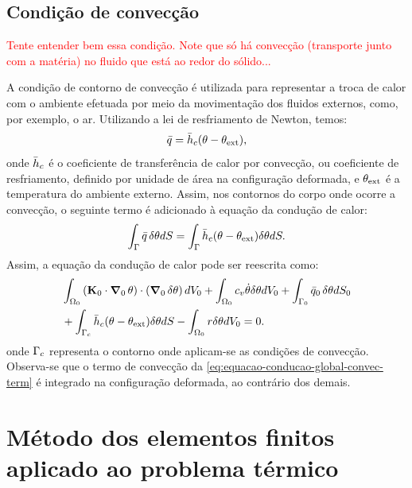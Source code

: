 \documentclass[Tese.tex]{subfiles}
\begin{document}
\subsection{Condição de convecção}

\textcolor{red}{Tente entender bem essa condição. Note que só há convecção (transporte junto com a matéria) no fluido que está ao redor do sólido...}

A condição de contorno de convecção é utilizada para representar a troca de calor com o ambiente efetuada por meio da movimentação dos fluidos externos, como, por exemplo, o ar. Utilizando a lei de resfriamento de Newton, temos:
\begin{equation}
\bar{q} = \bar{h}_c(\theta-\theta_\text{ext}),
\end{equation}
onde $\bar{h}_c$ é o coeficiente de transferência de calor por convecção, ou coeficiente de resfriamento, definido por unidade de área na configuração deformada, e $\theta_\text{ext}$ é a temperatura do ambiente externo. Assim, nos contornos do corpo onde ocorre a convecção, o seguinte termo é adicionado à equação da condução de calor:
\begin{equation}
\int_{\Gamma}\bar{q}\,\delta\theta dS = \int_{\Gamma}\bar{h}_c(\theta-\theta_\text{ext})\delta\theta dS.
\end{equation}
Assim, a equação da condução de calor pode ser reescrita como:
\begin{equation}\label{eq:equacao-conducao-global-convec-term}
\begin{aligned}
&\int_{\Omega_0}\left(\mathbf{K}_0\cdot\boldsymbol{\nabla}_0\,\theta\right)\cdot\left(\boldsymbol{\nabla}_0\,\delta\theta\right) dV_0 + \int_{\Omega_0}c_v\dot{\theta}\delta\theta dV_0 + \int_{\Gamma_0}\bar{q}_0\,\delta\theta dS_0 \\& + \int_{\Gamma_{c}}\bar{h}_c(\theta-\theta_\text{ext})\delta\theta dS - \int_{\Omega_0} r\delta\theta dV_0  = 0.
\end{aligned}
\end{equation}
onde $\Gamma_{c}$ representa o contorno onde aplicam-se as condições de convecção. Observa-se que o termo de convecção da \cref{eq:equacao-conducao-global-convec-term} é integrado na configuração deformada, ao contrário dos demais.

\section{Método dos elementos finitos aplicado ao problema térmico}\label{sec:mef-termo}
\end{document}
